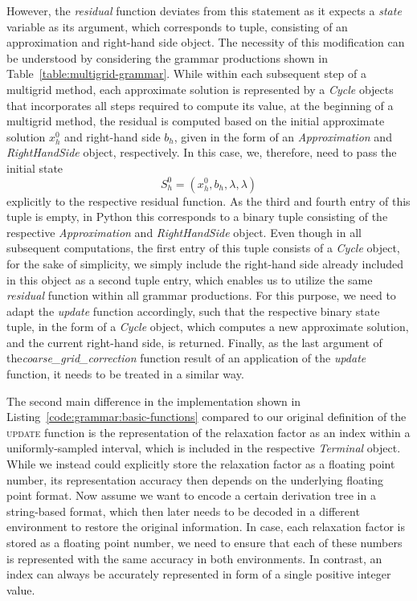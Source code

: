 However, the \emph{residual} function deviates from this statement as it expects a \emph{state} variable as its argument, which corresponds to tuple, consisting of an approximation and right-hand side object.
The necessity of this modification can be understood by considering the grammar productions shown in Table~\ref{table:multigrid-grammar}.
While within each subsequent step of a multigrid method, each approximate solution is represented by a \emph{Cycle} objects that incorporates all steps required to compute its value, at the beginning of a multigrid method, the residual is computed based on the initial approximate solution $x_h^0$ and right-hand side $b_h$, given in the form of an \emph{Approximation} and \emph{RightHandSide} object, respectively.
In this case, we, therefore, need to pass the initial state 
\begin{equation*}
	S_h^0 = (x_h^0, b_h, \lambda, \lambda)
\end{equation*} explicitly to the respective residual function.
As the third and fourth entry of this tuple is empty, in Python this corresponds to a binary tuple consisting of the respective \emph{Approximation} and \emph{RightHandSide} object.
Even though in all subsequent computations, the first entry of this tuple consists of a \emph{Cycle} object, for the sake of simplicity, we simply include the right-hand side already included in this object as a second tuple entry, which enables us to utilize the same \emph{residual} function within all grammar productions.
For this purpose, we need to adapt the \emph{update} function accordingly, such that the respective binary state tuple, in the form of a \emph{Cycle} object, which computes a new approximate solution, and the current right-hand side, is returned.
Finally, as the last argument of the\emph{coarse\_grid\_correction} function result of an application of the \emph{update} function, it needs to be treated in a similar way.

The second main difference in the implementation shown in Listing~\ref{code:grammar:basic-functions} compared to our original definition of the \textsc{update} function is the representation of the relaxation factor as an index within a uniformly-sampled interval, which is included in the respective \emph{Terminal} object.
While we instead could explicitly store the relaxation factor as a floating point number, its representation accuracy then depends on the underlying floating point format.
Now assume we want to encode a certain derivation tree in a string-based format, which then later needs to be decoded in a different environment to restore the original information.
In case, each relaxation factor is stored as a floating point number, we need to ensure that each of these numbers is represented with the same accuracy in both environments.
In contrast, an index can always be accurately represented in form of a single positive integer value.

